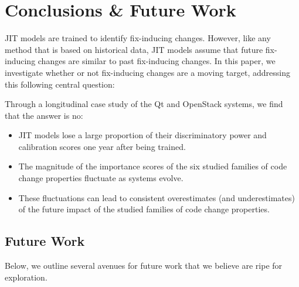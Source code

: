 \section{Conclusions \& Future Work}
\label{sec:conclusions}

JIT models are trained to identify fix-inducing changes.
However, like any method that is based on historical data, JIT models assume that future fix-inducing changes are similar to past fix-inducing changes.
In this paper, we investigate whether or not fix-inducing changes are a moving target, addressing this following central question:

\conjecture

Through a longitudinal case study of the {\sc Qt} and {\sc OpenStack} systems, we find that the answer is no:

\begin{itemize}
  \item JIT models lose a large proportion of their discriminatory power and calibration scores one year after being trained.
  \item The magnitude of the importance scores of the six studied families of code change properties fluctuate as systems evolve.
  \item These fluctuations can lead to consistent overestimates (and underestimates) of the future impact of the studied families of code change properties.
\end{itemize}

\subsection{Future Work}

Below, we outline several avenues for future work that we believe are ripe for exploration.

